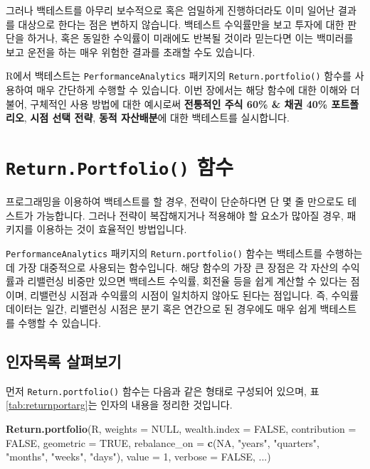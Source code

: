 \documentclass[12pt,]{book}
\newenvironment{Shaded}{\begin{snugshade}}{\end{snugshade}}
\newcommand{\DataTypeTok}[1]{\textcolor[rgb]{0.13,0.29,0.53}{#1}}
\newcommand{\DecValTok}[1]{\textcolor[rgb]{0.00,0.00,0.81}{#1}}
\newcommand{\KeywordTok}[1]{\textcolor[rgb]{0.13,0.29,0.53}{\textbf{#1}}}
\newcommand{\NormalTok}[1]{#1}
\newcommand{\OtherTok}[1]{\textcolor[rgb]{0.56,0.35,0.01}{#1}}
\newcommand{\StringTok}[1]{\textcolor[rgb]{0.31,0.60,0.02}{#1}}
\begin{document}
그러나 백테스트를 아무리 보수적으로 혹은 엄밀하게 진행하더라도 이미 일어난 결과를 대상으로 한다는 점은 변하지 않습니다. 백테스트 수익률만을 보고 투자에 대한 판단을 하거나, 혹은 동일한 수익률이 미래에도 반복될 것이라 믿는다면 이는 백미러를 보고 운전을 하는 매우 위험한 결과를 초래할 수도 있습니다.

R에서 백테스트는 \texttt{PerformanceAnalytics} 패키지의 \texttt{Return.portfolio()} 함수를 사용하여 매우 간단하게 수행할 수 있습니다. 이번 장에서는 해당 함수에 대한 이해와 더불어, 구체적인 사용 방법에 대한 예시로써 \textbf{전통적인 주식 60\% \& 채권 40\% 포트폴리오}, \textbf{시점 선택 전략}, \textbf{동적 자산배분}에 대한 백테스트를 실시합니다.

\hypertarget{return.portfolio-}{%
\section{\texorpdfstring{\texttt{Return.Portfolio()} 함수}{Return.Portfolio() 함수}}\label{return.portfolio-}}

프로그래밍을 이용하여 백테스트를 할 경우, 전략이 단순하다면 단 몇 줄 만으로도 테스트가 가능합니다. 그러나 전략이 복잡해지거나 적용해야 할 요소가 많아질 경우, 패키지를 이용하는 것이 효율적인 방법입니다.

\texttt{PerformanceAnalytics} 패키지의 \texttt{Return.portfolio()} 함수는 백테스트를 수행하는데 가장 대중적으로 사용되는 함수입니다. 해당 함수의 가장 큰 장점은 각 자산의 수익률과 리밸런싱 비중만 있으면 백테스트 수익률, 회전율 등을 쉽게 계산할 수 있다는 점이며, 리밸런싱 시점과 수익률의 시점이 일치하지 않아도 된다는 점입니다. 즉, 수익률 데이터는 일간, 리밸런싱 시점은 분기 혹은 연간으로 된 경우에도 매우 쉽게 백테스트를 수행할 수 있습니다.

\hypertarget{section-80}{%
\subsection{인자목록 살펴보기}\label{section-80}}

먼저 \texttt{Return.portfolio()} 함수는 다음과 같은 형태로 구성되어 있으며, 표 \ref{tab:returnportarg}는 인자의 내용을 정리한 것입니다.

\begin{Shaded}
\begin{Highlighting}[]
\KeywordTok{Return.portfolio}\NormalTok{(R, }\DataTypeTok{weights =} \OtherTok{NULL}\NormalTok{, }\DataTypeTok{wealth.index =} \OtherTok{FALSE}\NormalTok{,}
  \DataTypeTok{contribution =} \OtherTok{FALSE}\NormalTok{, }\DataTypeTok{geometric =} \OtherTok{TRUE}\NormalTok{,}
  \DataTypeTok{rebalance_on =} \KeywordTok{c}\NormalTok{(}\OtherTok{NA}\NormalTok{, }\StringTok{"years"}\NormalTok{, }\StringTok{"quarters"}\NormalTok{, }
                   \StringTok{"months"}\NormalTok{, }\StringTok{"weeks"}\NormalTok{, }\StringTok{"days"}\NormalTok{),}
  \DataTypeTok{value =} \DecValTok{1}\NormalTok{, }\DataTypeTok{verbose =} \OtherTok{FALSE}\NormalTok{, ...)}
\end{Highlighting}
\end{Shaded}
\end{document}
